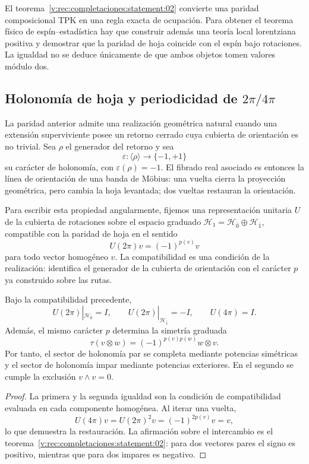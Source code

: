 El teorema~\ref{v:rec:completaciones:statement:02} convierte una paridad composicional TPK en una regla exacta de
ocupación. Para obtener el teorema físico de espín--estadística hay que
construir además una teoría local lorentziana positiva y demostrar que la
paridad de hoja coincide con el espín bajo rotaciones. La igualdad no se
deduce únicamente de que ambos objetos tomen valores módulo dos.

\subsection{Holonomía de hoja y periodicidad de \texorpdfstring{\(2\pi/4\pi\)}{2pi/4pi}}
\label{v:rec:completaciones:section:05}

La paridad anterior admite una realización geométrica natural cuando una
extensión superviviente posee un retorno cerrado cuya cubierta de orientación
es no trivial. Sea \(\rho\) el generador del retorno y sea
\[
 \varepsilon:\langle\rho\rangle\longrightarrow\{-1,+1\}
\]
su carácter de holonomía, con \(\varepsilon(\rho)=-1\). El fibrado real
asociado es entonces la línea de orientación de una banda de Möbius: una
vuelta cierra la proyección geométrica, pero cambia la hoja levantada; dos
vueltas restauran la orientación.

Para escribir esta propiedad angularmente, fijemos una representación
unitaria \(U\) de la cubierta de rotaciones sobre el espacio graduado
\(\mathcal H_1=\mathcal H_{\bar0}\oplus\mathcal H_{\bar1}\), compatible con
la paridad de hoja en el sentido
\[
 U(2\pi)v=(-1)^{p(v)}v
\]
para todo vector homogéneo \(v\). La compatibilidad es una condición de la
realización: identifica el generador de la cubierta de orientación con el
carácter \(p\) ya construido sobre las rutas.

\begin{theorem}
\label{v:rec:thm:dos-cuatro-pi-estadistica}
Bajo la compatibilidad precedente,
\[
 U(2\pi)|_{\mathcal H_{\bar0}}=I,
 \qquad
 U(2\pi)|_{\mathcal H_{\bar1}}=-I,
 \qquad
 U(4\pi)=I.
\]
Además, el mismo carácter \(p\) determina la simetría graduada
\[
 \tau(v\otimes w)=(-1)^{p(v)p(w)}w\otimes v.
\]
Por tanto, el sector de holonomía par se completa mediante potencias
simétricas y el sector de holonomía impar mediante potencias exteriores. En
el segundo se cumple la exclusión \(v\wedge v=0\).
\end{theorem}

\begin{proof}
La primera y la segunda igualdad son la condición de compatibilidad evaluada
en cada componente homogénea. Al iterar una vuelta,
\[
 U(4\pi)v=U(2\pi)^2v=(-1)^{2p(v)}v=v,
\]
lo que demuestra la restauración. La afirmación sobre el intercambio es el
teorema~\ref{v:rec:completaciones:statement:02}: para dos vectores
pares el signo es positivo, mientras que para dos impares es negativo.
\end{proof}


